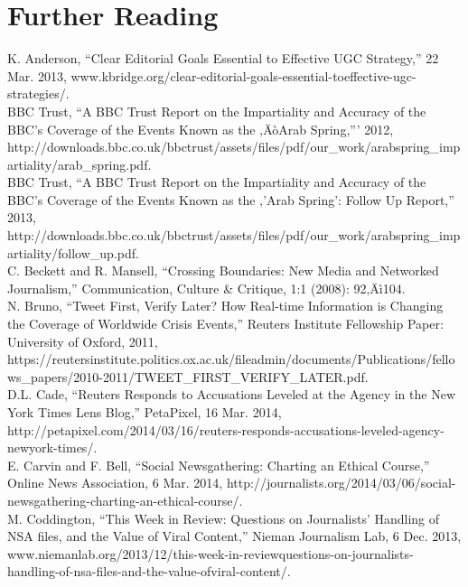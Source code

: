 
\chapter{Further Reading}

K. Anderson, ``Clear Editorial Goals Essential to Effective UGC Strategy,'' 22 Mar. 2013, www.kbridge.org/clear-editorial-goals-essential-toeffective-ugc-strategies/.\\
BBC Trust, ``A BBC Trust Report on the Impartiality and Accuracy of the BBC's Coverage of the Events Known as the ‚ÄòArab Spring,''' 2012, http://downloads.bbc.co.uk/bbctrust/assets/files/pdf/our_work/arabspring_impartiality/arab_spring.pdf.\\

BBC Trust, ``A BBC Trust Report on the Impartiality and Accuracy of the BBC's Coverage of the Events Known as the ‚'Arab Spring': Follow Up Report,'' 2013, http://downloads.bbc.co.uk/bbctrust/assets/files/pdf/our_work/arabspring_impartiality/follow_up.pdf.\\

C. Beckett and R. Mansell, ``Crossing Boundaries: New Media and Networked Journalism,'' Communication, Culture & Critique, 1:1 (2008): 92‚Äì104.\\

N. Bruno, ``Tweet First, Verify Later? How Real-time Information is
Changing the Coverage of Worldwide Crisis Events,'' Reuters Institute Fellowship Paper: University of Oxford, 2011, https://reutersinstitute.politics.ox.ac.uk/fileadmin/documents/Publications/fellows_papers/2010-2011/TWEET_FIRST_VERIFY_LATER.pdf.\\

D.L. Cade, ``Reuters Responds to Accusations Leveled at the Agency in the New York Times Lens Blog,'' PetaPixel, 16 Mar. 2014, http://petapixel.com/2014/03/16/reuters-responds-accusations-leveled-agency-newyork-times/.\\

E. Carvin and F. Bell, ``Social Newsgathering: Charting an Ethical Course,'' Online News Association, 6 Mar. 2014, http://journalists.org/2014/03/06/social-newsgathering-charting-an-ethical-course/.\\

M. Coddington, ``This Week in Review: Questions on Journalists' Handling of NSA files, and the Value of Viral Content,'' Nieman Journalism Lab, 6 Dec. 2013, www.niemanlab.org/2013/12/this-week-in-reviewquestions-on-journalists-handling-of-nsa-files-and-the-value-ofviral-content/.\\

